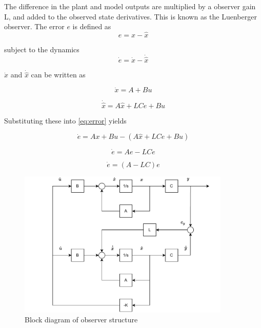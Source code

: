 The difference in the plant and model outputs are multiplied by a observer gain L, and added to the observed state derivatives. This is known as the Luenberger observer. The error $e$ is defined as
\begin{equation} \label{eq:error}
	e = x-\hat{x}
\end{equation}

subject to the dynamics
\begin{equation}
	\dot{e} = \dot{x}-\dot{\hat{x}}
\end{equation}

$\dot{x}$ and $\dot{\hat{x}}$ can be written as

\begin{equation}
	\dot{x} = A + Bu
\end{equation}


\begin{equation}
	\dot{\hat{x}} = A\hat{x} + LCe + Bu
\end{equation}

Substituting these into \cref{eq:error} yields

\begin{equation}
	\dot{e} = Ax + Bu - ( A\hat{x} + LCe  + Bu)
\end{equation}

\begin{equation}
	\dot{e} = Ae - LCe
\end{equation}

\begin{equation} \label{eq:obs_error_dot}
	\dot{e} = (A - LC)e
\end{equation}

\begin{figure}[h!]
	\centering
	\includegraphics[width=0.9\textwidth]{Graphics/Observer_Diagram.pdf}
	\caption{Block diagram of observer structure}
	\label{fig:luenberger}
\end{figure}


